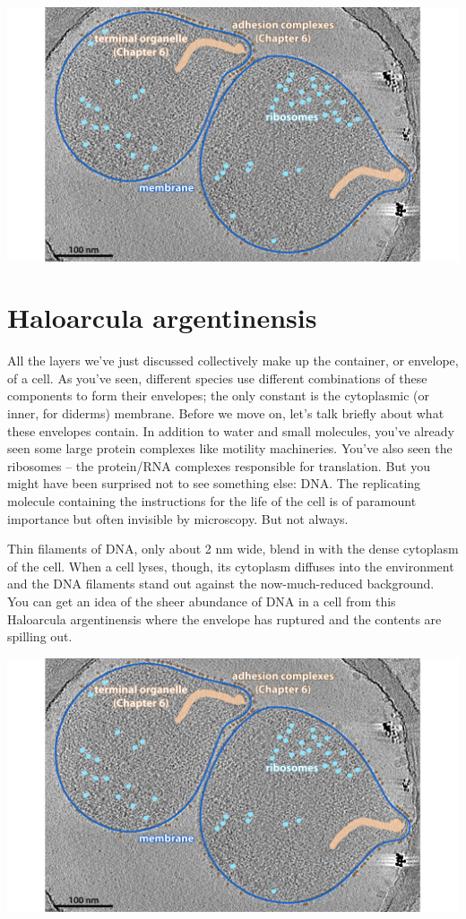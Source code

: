 \documentclass[]{tufte-book}
\begin{document}
\includegraphics{img/02_static/2_1_Mgenitalium}

\section{Haloarcula argentinensis}\label{haloarcula-argentinensis}

All the layers we've just discussed collectively make up the container,
or envelope, of a cell. As you've seen, different species use different
combinations of these components to form their envelopes; the only
constant is the cytoplasmic (or inner, for diderms) membrane. Before we
move on, let's talk briefly about what these envelopes contain. In
addition to water and small molecules, you've already seen some large
protein complexes like motility machineries. You've also seen the
ribosomes -- the protein/RNA complexes responsible for translation. But
you might have been surprised not to see something else: DNA. The
replicating molecule containing the instructions for the life of the
cell is of paramount importance but often invisible by microscopy. But
not always.

Thin filaments of DNA, only about 2 nm wide, blend in with the dense
cytoplasm of the cell. When a cell lyses, though, its cytoplasm diffuses
into the environment and the DNA filaments stand out against the
now-much-reduced background. You can get an idea of the sheer abundance
of DNA in a cell from this Haloarcula argentinensis where the envelope
has ruptured and the contents are spilling out.

\includegraphics{img/02_static/2_1_Mgenitalium}
\end{document}

